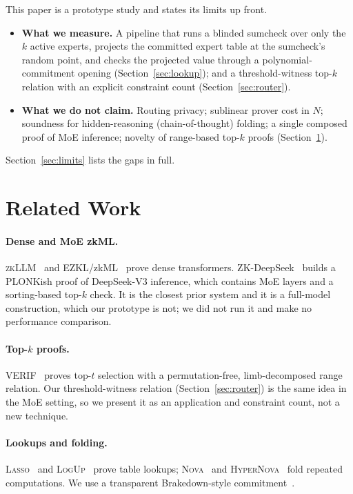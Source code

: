 \documentclass[10pt,twocolumn]{article}
\begin{document}
This paper is a prototype study and states its limits up front.
\begin{itemize}[leftmargin=*,itemsep=2pt]
    \item \textbf{What we measure.} A pipeline that runs a blinded sumcheck over only the $k$ active experts, projects the committed expert table at the sumcheck's random point, and checks the projected value through a polynomial-commitment opening (Section~\ref{sec:lookup}); and a threshold-witness top-$k$ relation with an explicit constraint count (Section~\ref{sec:router}).
    \item \textbf{What we do not claim.} Routing privacy; sublinear prover cost in $N$; soundness for hidden-reasoning (chain-of-thought) folding; a single composed proof of MoE inference; novelty of range-based top-$k$ proofs (Section~\ref{sec:related}).
\end{itemize}
Section~\ref{sec:limits} lists the gaps in full.

\section{Related Work}
\label{sec:related}
\paragraph{Dense and MoE zkML.} \textsc{zkLLM}~\cite{sun2024zkllm} and \textsc{EZKL}/zkML~\cite{chen2024zkml} prove dense transformers. ZK-DeepSeek~\cite{wang2025zkdeepseek} builds a PLONKish proof of DeepSeek-V3 inference, which contains MoE layers and a sorting-based top-$k$ check. It is the closest prior system and it is a full-model construction, which our prototype is not; we did not run it and make no performance comparison.
\paragraph{Top-$k$ proofs.} VERIF~\cite{zhang2026verif} proves top-$t$ selection with a permutation-free, limb-decomposed range relation. Our threshold-witness relation (Section~\ref{sec:router}) is the same idea in the MoE setting, so we present it as an application and constraint count, not a new technique.
\paragraph{Lookups and folding.} \textsc{Lasso}~\cite{setty2024unlocking} and \textsc{LogUp}~\cite{habock2022logup} prove table lookups; \textsc{Nova}~\cite{kothapalli2022nova} and \textsc{HyperNova}~\cite{kothapalli2024hypernova} fold repeated computations. We use a transparent Brakedown-style commitment~\cite{golovnev2023brakedown}.
\end{document}
